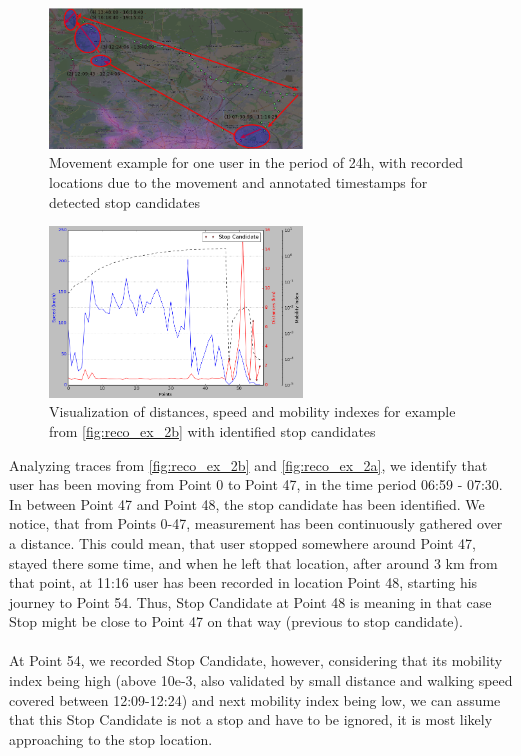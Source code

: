 \begin{figure}[!ht]
 	\centering
 	\includegraphics[width=0.6\textwidth]{images/reco_example_2b.png}
 	\caption{ Movement example for one user in the period of 24h, with recorded locations due to the movement and annotated timestamps for detected stop candidates }
 	\label{fig:reco_ex_2b}
\end{figure}
\begin{figure}[!ht]
 	\centering
 	\includegraphics[width=0.6\textwidth]{images/reco_example_2a.png}
 	\caption{ Visualization of distances, speed and mobility indexes for example from \autoref{fig:reco_ex_2b} with identified stop candidates }
	\label{fig:reco_ex_2a}
\end{figure} 
Analyzing traces from \autoref{fig:reco_ex_2b} and \autoref{fig:reco_ex_2a}, we identify that user has been moving from Point 0 to Point 47, in the time period 06:59 - 07:30. In between Point 47 and Point 48, the stop candidate has been identified. We notice, that from Points 0-47, measurement has been continuously gathered over a distance. This could mean, that user stopped somewhere around Point 47, stayed there some time, and when he left that location, after around 3 km from that point, at 11:16 user has been recorded in location Point 48, starting his journey to Point 54. Thus, Stop Candidate at Point 48 is meaning in that case Stop might be close to Point 47 on that way (previous to stop candidate). 
\\\\
At Point 54, we recorded Stop Candidate, however, considering that its mobility index being high (above 10e-3, also validated by small distance and walking speed covered between 12:09-12:24) and next mobility index being low, we can assume that this Stop Candidate is not a stop and have to be ignored, it is most likely approaching to the stop location. 
